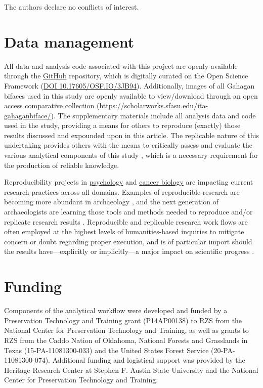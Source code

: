 \documentclass[]{interact}
\theoremstyle{plain}%
\theoremstyle{definition}
\theoremstyle{remark}
\begin{document}
The authors declare no conflicts of interest.

\hypertarget{data-management}{%
\section*{Data management}\label{data-management}}

All data and analysis code associated with this project are openly
available through the
\href{https://github.com/seldenlab/gahaganmorph.5}{GitHub} repository,
which is digitally curated on the Open Science Framework
(\href{https://osf.io/3jb94/}{DOI 10.17605/OSF.IO/3JB94}). Additionally,
images of all Gahagan bifaces used in this study are openly available to
view/download through an open access comparative collection
(\url{https://scholarworks.sfasu.edu/ita-gahaganbiface/}). The
supplementary materials include all analysis data and code used in the
study, providing a means for others to reproduce (exactly) those results
discussed and expounded upon in this article. The replicable nature of
this undertaking provides others with the means to critically assess and
evaluate the various analytical components of this study
\citep{RN20915, RN20916, RN20917}, which is a necessary requirement for
the production of reliable knowledge.

Reproducibility projects in \href{https://osf.io/ezcuj/}{psychology} and
\href{https://www.cos.io/rpcb}{cancer biology} are impacting current
research practices across all domains. Examples of reproducible research
are becoming more abundant in archaeology
\citep{RN20804, RN21009, RN21001, RN9364, RN11097}, and the next
generation of archaeologists are learning those tools and methods needed
to reproduce and/or replicate research results \citep{RN21007}.
Reproducible and replicable research work flows are often employed at
the highest levels of humanities-based inquiries to mitigate concern or
doubt regarding proper execution, and is of particular import should the
results have---explicitly or implicitly---a major impact on scientific
progress \citep{RN21008}.

\hypertarget{funding}{%
\section*{Funding}\label{funding}}

Components of the analytical workflow were developed and funded by a
Preservation Technology and Training grant (P14AP00138) to RZS from the
National Center for Preservation Technology and Training, as well as
grants to RZS from the Caddo Nation of Oklahoma, National Forests and
Grasslands in Texas (15-PA-11081300-033) and the United States Forest
Service (20-PA-11081300-074). Additional funding and logistical support
was provided by the Heritage Research Center at Stephen F. Austin State
University and the National Center for Preservation Technology and
Training.



\end{document}
